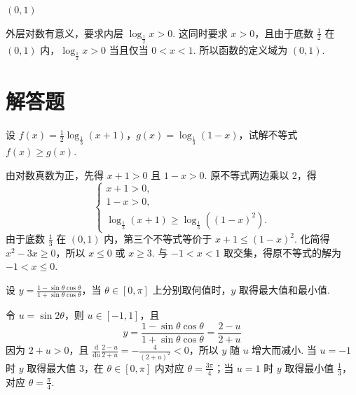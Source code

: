 \documentclass[UTF8,a4paper,oneside,11pt]{ctexbook}
\begin{document}
\begin{answer}
\(\left( 0,1 \right)\)
\end{answer}

\begin{solution}
外层对数有意义，要求内层 \(\log_{\frac12}x>0\). 这同时要求 \(x>0\)，且由于底数 \(\frac12\) 在 \((0,1)\) 内，\(\log_{\frac12}x>0\) 当且仅当 \(0<x<1\). 所以函数的定义域为 \((0,1)\).
\end{solution}

\section{解答题}

\begin{problem}

设 \(f(x)=\frac{1}{2}\log_{\frac{1}{3}}(x+1)\)，\(g(x)=\log_{\frac{1}{3}}(1-x)\)，试解不等式 \(f(x)\geqslant g(x)\).
\end{problem}

\begin{solution}
由对数真数为正，先得 \(x+1>0\) 且 \(1-x>0\). 原不等式两边乘以 \(2\)，得
\[
\begin{cases}
x+1>0,\\
1-x>0,\\
\log_{\frac{1}{3}}(x+1)\geqslant \log_{\frac{1}{3}}\left((1-x)^2\right).
\end{cases}
\]
由于底数 \(\frac13\) 在 \((0,1)\) 内，第三个不等式等价于 \(x+1\leqslant(1-x)^2\). 化简得 \(x^2-3x\geqslant0\)，所以 \(x\leqslant0\) 或 \(x\geqslant3\). 与 \(-1<x<1\) 取交集，得原不等式的解为 \(-1<x\leqslant0\).
\end{solution}

\begin{problem}

设 \(y=\frac{1-\sin\theta\cos\theta}{1+\sin\theta\cos\theta} \)，当 \(\theta\in[0,\pi] \) 上分别取何值时，\(y\) 取得最大值和最小值.
\end{problem}

\begin{solution}
令 \(u=\sin2\theta\)，则 \(u\in[-1,1]\)，且
\[
y=\frac{1-\sin\theta\cos\theta}{1+\sin\theta\cos\theta}=\frac{2-u}{2+u}
\]
因为 \(2+u>0\)，且 \(\frac{\mathrm d}{\mathrm du}\frac{2-u}{2+u}=-\frac{4}{(2+u)^2}<0\)，所以 \(y\) 随 \(u\) 增大而减小. 当 \(u=-1\) 时 \(y\) 取得最大值 \(3\)，在 \(\theta\in[0,\pi]\) 内对应 \(\theta=\frac{3\pi}{4}\)；当 \(u=1\) 时 \(y\) 取得最小值 \(\frac13\)，对应 \(\theta=\frac{\pi}{4}\).
\end{solution}
\end{document}
